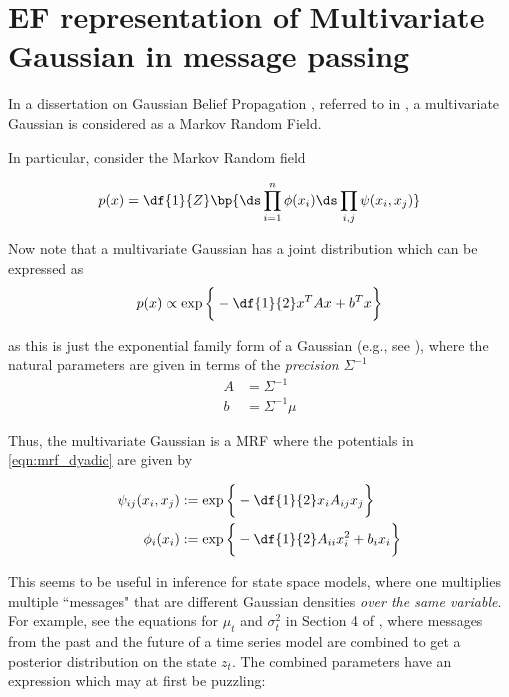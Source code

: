 \documentclass{article} %
\newcommand{\selfpotential}{\phi}
\newcommand{\edgepotential}{\psi}
\begin{document}
\newpage 
 \appendix
 
 \section{EF representation of Multivariate Gaussian in message passing}
 \label{sec:mvn_in_message_passing}
 
In a dissertation on Gaussian Belief Propagation \cite{bickson2008gaussian}, referred to in \cite{krishnan2016structured}, a multivariate Gaussian is considered as a Markov Random Field. 

In particular, consider the Markov Random field

\begin{equation}
p(x) = \df{1}{Z}\bp{ \ds\prod_{i=1}^n \selfpotential(x_i) \ds\prod_{i,j} \edgepotential(x_i, x_j)  } 
\label{eqn:mrf_dyadic}
\end{equation}

Now note that a multivariate Gaussian has a joint distribution which can be expressed as
\[ p(x) \propto \exp \bigg\{ -\df{1}{2} x^T A x + b^T x \bigg\} \]

as this is just the exponential family form of a Gaussian (e.g., see  \cite{englehardt_gaussian_models}), where the natural parameters are
given in terms of the \textit{precision} $\Sigma^{-1}$
\begin{align*}
A &= \Sigma^{-1} \\
b &= \Sigma^{-1} \mu
\end{align*}

Thus, the multivariate Gaussian is a MRF where the potentials in \eqref{eqn:mrf_dyadic} are given by

\begin{align*}
\edgepotential_{ij}(x_i, x_j) & := \exp \bigg\{ -\df{1}{2} x_i A_{ij} x_j \bigg\}  \\
\selfpotential_{i}(x_i) & := \exp \bigg\{ -\df{1}{2} A_{ii} x_i^2 + b_i x_i \bigg\}  
\end{align*}

This seems to be useful in inference for state space models, where one multiplies multiple ``messages" that are different Gaussian densities \textit{over the same variable}.   For example, see  the equations for $\mu_t$ and $\sigma^2_t$ in Section 4 of \cite{krishnan2016structured}, where messages from the past and the future of a time series model are combined to get a posterior distribution on the state $z_t$.   The combined parameters have an expression which may at first be puzzling:
\end{document}
